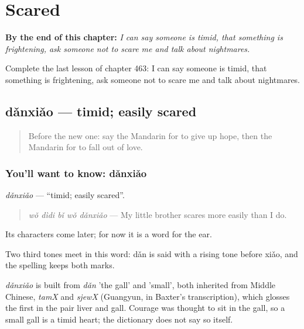 
\chapter{Scared}
\label{ch:zh-scared}

\begin{chapteropening}
\textbf{By the end of this chapter:} \emph{I can say someone is timid, that something is frightening, ask someone not to scare me and talk about nightmares.}

Complete the last lesson of chapter 463: I can say someone is timid, that something is frightening, ask someone not to scare me and talk about nightmares.
\end{chapteropening}

\section[dǎnxiǎo]{dǎnxiǎo — timid; easily scared}

\label{lesson:ZH-C463-danxiao}



\begin{quote}
Before the new one: say the Mandarin for to give up hope, then the Mandarin for to fall out of love.
\end{quote}

\subsection*{You'll want to know: dǎnxiǎo}
\emph{dǎnxiǎo} — \textquotedblleft{}timid; easily scared\textquotedblright{}.

\begin{quote}
\emph{wǒ dìdi bǐ wǒ dǎnxiǎo} — My little brother scares more easily than I do.
\end{quote}

Its characters come later; for now it is a word for the ear.

Two third tones meet in this word: dǎn is said with a rising tone before xiǎo, and the spelling keeps both marks.

\begin{cousinweb}
\emph{dǎnxiǎo} is built from \emph{dǎn} 'the gall' and  'small', both inherited from Middle Chinese, \emph{tamX} and \emph{sjewX} (Guangyun, in Baxter's transcription), which glosses the first in the pair liver and gall. Courage was thought to sit in the gall, so a small gall is a timid heart; the dictionary does not say so itself.
\end{cousinweb}

